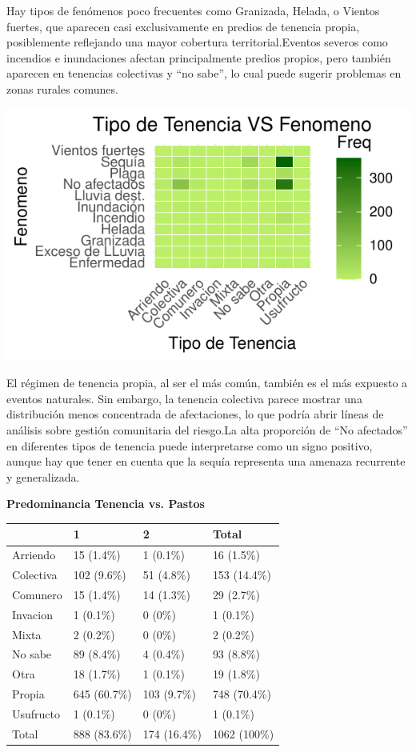 \documentclass[]{tufte-handout}
\begin{document}
Hay tipos de fenómenos poco frecuentes como Granizada, Helada, o Vientos
fuertes, que aparecen casi exclusivamente en predios de tenencia propia,
posiblemente reflejando una mayor cobertura territorial.Eventos severos
como incendios e inundaciones afectan principalmente predios propios,
pero también aparecen en tenencias colectivas y ``no sabe'', lo cual
puede sugerir problemas en zonas rurales comunes.

\begin{marginfigure}
\includegraphics[width=1.3\linewidth]{Informe_files/figure-latex/heat4-1} \end{marginfigure}

El régimen de tenencia propia, al ser el más común, también es el más
expuesto a eventos naturales. Sin embargo, la tenencia colectiva parece
mostrar una distribución menos concentrada de afectaciones, lo que
podría abrir líneas de análisis sobre gestión comunitaria del riesgo.La
alta proporción de ``No afectados'' en diferentes tipos de tenencia
puede interpretarse como un signo positivo, aunque hay que tener en
cuenta que la sequía representa una amenaza recurrente y generalizada.

\begin{center}
\textbf{Predominancia Tenencia vs. Pastos}
\end{center}

\begin{tabular}{llll}
\toprule
  & 1 & 2 & Total\\
\midrule
Arriendo & 15 (1.4\%) & 1 (0.1\%) & 16 (1.5\%)\\
Colectiva & 102 (9.6\%) & 51 (4.8\%) & 153 (14.4\%)\\
Comunero & 15 (1.4\%) & 14 (1.3\%) & 29 (2.7\%)\\
Invacion & 1 (0.1\%) & 0 (0\%) & 1 (0.1\%)\\
Mixta & 2 (0.2\%) & 0 (0\%) & 2 (0.2\%)\\
\addlinespace
No sabe & 89 (8.4\%) & 4 (0.4\%) & 93 (8.8\%)\\
Otra & 18 (1.7\%) & 1 (0.1\%) & 19 (1.8\%)\\
Propia & 645 (60.7\%) & 103 (9.7\%) & 748 (70.4\%)\\
Usufructo & 1 (0.1\%) & 0 (0\%) & 1 (0.1\%)\\
Total & 888 (83.6\%) & 174 (16.4\%) & 1062 (100\%)\\
\bottomrule
\end{tabular}
\vspace{0.7 cm}
\end{document}
